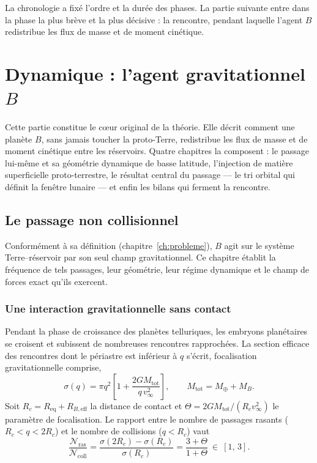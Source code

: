 \documentclass[11pt,a4paper,openany]{report}
\newcommand{\Mt}{M_{\oplus}}
\newcommand{\Req}{R_{\mathrm{eq}}}
\newcommand{\Mtot}{M_{\mathrm{tot}}}
\begin{document}
\begin{rappel}
La chronologie a fixé l'ordre et la durée des phases. La partie suivante entre dans la phase la plus
brève et la plus décisive : la rencontre, pendant laquelle l'agent $B$ redistribue les flux de masse
et de moment cinétique.
\end{rappel}

\part{Dynamique : l'agent gravitationnel \texorpdfstring{$B$}{B}}
\label{part:dynamique}

\noindent
Cette partie constitue le c\oe ur original de la théorie. Elle décrit comment une planète $B$,
sans jamais toucher la proto-Terre, redistribue les flux de masse et de moment cinétique entre les
réservoirs. Quatre chapitres la composent : le passage lui-même et sa géométrie dynamique de basse latitude,
l'injection de matière superficielle proto-terrestre, le résultat central du passage --- le tri
orbital qui définit la fenêtre lunaire --- et enfin les bilans qui ferment la rencontre.

\chapter{Le passage non collisionnel}
\label{ch:passage}\label{sec:passage}

Conformément à sa définition (chapitre~\ref{ch:probleme}), $B$ agit sur le système
Terre--réservoir par son seul champ gravitationnel. Ce chapitre établit la fréquence de tels
passages, leur géométrie, leur régime dynamique et le champ de forces exact qu'ils exercent.

\section{Une interaction gravitationnelle sans contact}

Pendant la phase de croissance des planètes telluriques, les embryons planétaires se croisent
et subissent de nombreuses rencontres rapprochées. La section efficace des rencontres dont le
périastre est inférieur à $q$ s'écrit, focalisation gravitationnelle comprise,
\begin{equation}
\sigma(q)=\pi q^2\left[1+\frac{2G\Mtot}{q\,v_\infty^2}\right],
\qquad \Mtot=\Mt+M_B.
\label{eq:sigma}
\end{equation}
Soit $R_c=\Req+R_{B,\mathrm{eff}}$ la distance de contact et $\Theta=2G\Mtot/(R_c v_\infty^2)$ le
paramètre de focalisation. Le rapport entre le nombre de passages rasants
($R_c<q<2R_c$) et le nombre de collisions ($q<R_c$) vaut
\begin{equation}
\frac{\mathcal{N}_{\mathrm{ras}}}{\mathcal{N}_{\mathrm{coll}}}
=\frac{\sigma(2R_c)-\sigma(R_c)}{\sigma(R_c)}
=\frac{3+\Theta}{1+\Theta}\ \in\ [1,\,3].
\label{eq:frequence}
\end{equation}
\end{document}
